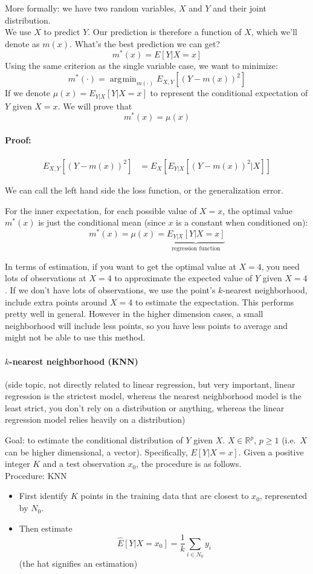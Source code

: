 \documentclass[12 pt]{article}
\DeclareMathOperator*{\argmin}{arg\!\min}
\begin{document}
More formally: we have two random variables, $X$ and $Y$ and their
joint distribution.
\\ We use $X$ to predict $Y$. Our prediction is therefore a function
of $X$, which we'll denote as $m(x)$. What's the best prediction we
can get?
$$m^*(x) = E[Y | X = x]$$
Using the same criterion as the single variable case, we want to
minimize:
$$m^*(\cdot) = \argmin_{m(\cdot)} E_{X,Y}[(Y-m(x))^2]$$
If we denote $\mu(x) = E_{Y|X}[Y|X = x]$ to represent the conditional
expectation of $Y$ given $X = x$. We will prove that
$$m^*(x) = \mu(x)$$
\paragraph{Proof:}
\begin{align*}
  E_{X,Y}[(Y-m(x))^2] & = E_{X}[E_{Y|X}[(Y-m(x))^2 | X]]
\end{align*}

We can call the left hand side the loss function, or the
generalization error.

For the inner expectation, for each possible value of $X = x$, the
optimal value $m^*(x)$ is just the conditional mean (since $x$ is a
constant when conditioned on):
$$m^*(x) = \mu(x) = \underbrace{E_{Y|X}[Y|X = x]}_{\text{regression function}}$$

In terms of estimation, if you want to get the optimal value at $X=4$,
you need lots of observations at $X=4$ to approximate the expected
value of $Y$ given $X = 4$. If we don't have lots of observations, we
use the point's $k$-nearest neighborhood, include extra points around $X =
4$ to estimate the expectation. This performs pretty well in
general. However in the higher dimension cases, a small neighborhood
will include less points, so you have less points to average and might
not be able to use this method.
\paragraph{$k$-nearest neighborhood (KNN)} (side topic, not directly related
to linear regression, but very important, linear regression is the
strictest model, whereas the nearest neighborhood model is the least
strict, you don't rely on a distribution or anything, whereas the
linear regression model relies heavily on a distribution)

Goal: to estimate the conditional distribution of $Y$ given $X$. $X
\in \mathbb{R}^p$, $p \geq 1$ (i.e.\ $X$ can be higher dimensional, a
vector). Specifically, $E[Y | X = x]$. Given a positive integer $K$
and a test observation $x_0$, the procedure is as follows.
\\ Procedure: KNN
\begin{itemize}
\item First identify $K$ points in the training data that are closest
  to $x_0$, represented by $N_0$.
\item Then estimate $$\hat{E}[Y | X = x_0] = \frac{1}{k} \sum_{i \in N_0}y_i$$
  (the hat signifies an estimation)
\end{itemize}
\end{document}
